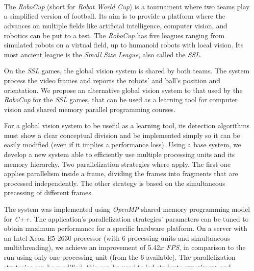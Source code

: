 \ \\
\ \\
\label{pagsumm}
\\
\ \\
\ \\

\ \\

\ \\
\ \\

The \emph{RoboCup} (short for \emph{Robot World Cup}) is a tournament where two
teams play a simplified version of football. Its aim is to provide a platform
where the advances on multiple fields like artificial intelligence, computer
vision, and robotics can be put to a test. The \emph{RoboCup} has five leagues
ranging from simulated robots on a virtual field, up to humanoid robots with
local vision. Its most ancient league is the \emph{Small Size League}, also
called the \emph{SSL}.

On the \emph{SSL} games, the global vision system is shared by both teams. The
system process the video frames and reports the robots' and ball's position and
orientation. We propose an alternative global vision system to that used by the
\emph{RoboCup} for the \emph{SSL} games, that can be used as a learning tool for
computer vision and shared memory parallel programming courses.

For a global vision system to be useful as a learning tool, its detection
algorithms must show a clear conceptual division and be implemented simply so it
can be easily modified (even if it implies a performance loss). Using a base
system, we develop a new system able to efficiently use multiple processing
units and its memory hierarchy. Two parallelization strategies where apply.
The first one applies parallelism inside a frame, dividing the frames into
fragments that are processed independently. The other strategy is based on the
simultaneous precessing of different frames.

The system was implemented using \emph{OpenMP} shared memory programming model
for \emph{C++}. The application's parallelization strategies' parameters can be
tuned to obtain maximum performance for a specific hardware platform. On a
server with an Intel Xeon E5-2630 processor (with 6 processing units and
simultaneous multithreading), we achieve an improvement of 5.42$x$ \emph{FPS},
in comparison to the run using only one processing unit (from the 6 available).
The parallelization strategies can be modified, this can be used to led students
experiment and analyze its results to explain its impact on the system
performance.

\vfill
\pagebreak
